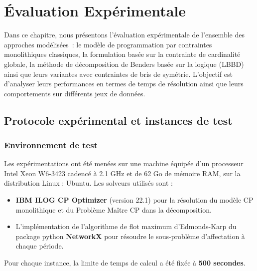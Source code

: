 \section{Évaluation Expérimentale}

    Dans ce chapitre, nous présentons l'évaluation expérimentale de l'ensemble des approches \mbox{modélisées :} le modèle de programmation par contraintes monolithiques classiques, la formulation basée sur la contrainte de cardinalité globale, la méthode de décomposition de Benders basée sur la logique (LBBD) ainsi que leurs variantes avec contraintes de bris de symétrie. L'objectif est d'analyser leurs performances en termes de temps de résolution ainsi que leurs comportements sur différents jeux de données.
\subsection{Protocole expérimental et instances de test}

\subsubsection{Environnement de test}
Les expérimentations ont été menées sur une machine équipée d'un processeur Intel Xeon W6-3423 cadencé à 2.1 GHz et de 62 Go de mémoire RAM, sur la distribution Linux : Ubuntu. Les solveurs utilisés sont :
\begin{itemize}
    \item \textbf{IBM ILOG CP Optimizer} (version 22.1) pour la résolution du modèle CP monolithique et du Problème Maître CP dans la décomposition.
    \item L'implémentation de l'algorithme de flot maximum d'Edmonds-Karp du package python \textbf{NetworkX} pour résoudre le sous-problème d'affectation à chaque période.
\end{itemize}
Pour chaque instance, la limite de temps de calcul a été fixée à \textbf{500 secondes}.

